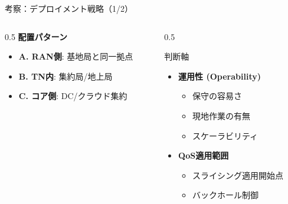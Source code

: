 \documentclass[dvipdfmx,11pt,aspectratio=169]{beamer}
\begin{document}
\begin{frame}{考察：デプロイメント戦略（1/2）}
\begin{columns}
\begin{column}{0.5\textwidth}
      \vspace{0.5em}
      \textbf{配置パターン}
      \begin{itemize}
        \item \textbf{A. RAN側}: 基地局と同一拠点
        \item \textbf{B. TN内}: 集約局/地上局
        \item \textbf{C. コア側}: DC/クラウド集約
      \end{itemize}
    \end{column}
    \begin{column}{0.5\textwidth}
      \begin{block}{判断軸}
        \begin{itemize}
          \item \textbf{運用性 (Operability)}
            \begin{itemize}
              \item 保守の容易さ
              \item 現地作業の有無
              \item スケーラビリティ
            \end{itemize}
          \item \textbf{QoS適用範囲}
            \begin{itemize}
              \item スライシング適用開始点
              \item バックホール制御
            \end{itemize}
        \end{itemize}
      \end{block}
    \end{column}
  \end{columns}
\end{frame}
\end{document}
